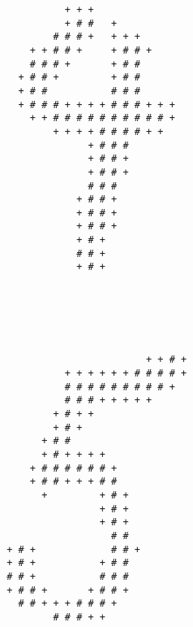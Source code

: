 \begin{multicols*}{2}
\begin{Verbatim}[samepage=true]
                                                        
\end{Verbatim}
\begin{Verbatim}[samepage=true]
                                                        
                                                        
                        + + +                           
                        + # #   +                       
                      # # # +   + + +                   
                  + + # # +     + # # +                 
                  # # # +       + # #                   
                + # # +         + # #                   
                + # #           # # #                   
                + # # # + + + + # # # + + +             
                  + + # # # # # # # # # # +             
                      + + + + # # # # + +               
                            + # # #                     
                            + # # +                     
                            + # # +                     
                            # # #                       
                          + # # +                       
                          + # # +                       
                          + # # +                       
                          + # +                         
                          # # +                         
                          + # +                         
                                                        
                                                        
\end{Verbatim}
\begin{Verbatim}[samepage=true]
                                                        
                                                        
                                                        
                                      + + # +           
                        + + + + + + # # # # +           
                        # # # # # # # # # +             
                        # # # + + + + +                 
                      + # + +                           
                      + # +                             
                    + # #                               
                    + # + + + +                         
                  + # # # # # # +                       
                  + # # + + + # #                       
                    +         + # +                     
                              + # +                     
                              + # +                     
                                # #                     
              + # +             # # +                   
              + # +           + # #                     
              # # +           # # #                     
              + # # +       + # # +                     
                # # + + + # # # +                       
                      # # # + +                         
                                                        

\end{Verbatim}
\end{multicols*}
